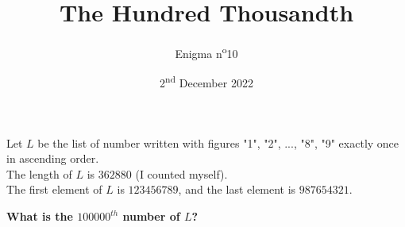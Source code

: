 \documentclass[a4paper, top=10mm]{article}
\title{\textbf{\huge{The Hundred Thousandth}}}
\author{Enigma n\textsuperscript{o}10}
\date{2\textsuperscript{nd} December 2022}
\begin{document}
	\maketitle
	
	Let $L$ be the list of number written with figures "1", "2", ..., "8", "9" exactly once in ascending order.\\
	The length of $L$ is $362880$ (I counted myself).\\
	The first element of $L$ is $123456789$, and the last element is $987654321$.
	
	\vspace{1cm}
	
	\textbf{What is the $100000^{th}$ number of $L$?}
	
\end{document}
